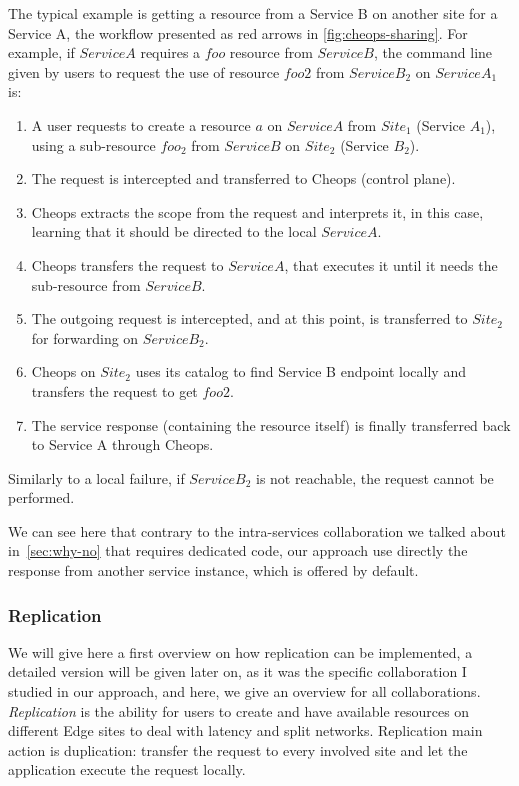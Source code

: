 The typical example is getting a resource from a Service B on another
site for a Service A, the workflow presented as red arrows in
\autoref{fig:cheops-sharing}.
%
For example, if $Service A$ requires a $foo$ resource from
$Service B$, the command line given by users to request the use of
resource $foo2$ from $Service B_2$ on $Service A_1$ is:

%

\begin{enumerate}
\item A user requests to create a resource $a$ on $Service A$ from $Site_1$
  (Service $A_1$), using a sub-resource $foo_2$ from $Service B$ on
  $Site_2$ (Service $B_2$).
\item The request is intercepted and transferred to Cheops (control
  plane).
\item Cheops extracts the scope from the request and interprets it, in
  this case, learning that it should be directed to the local
  $Service A$.
\item Cheops transfers the request to $Service A$, that executes it
  until it needs the sub-resource from $Service B$.
\item The outgoing request is intercepted, and at this point, is
  transferred to $Site_2$ for forwarding on $Service B_2$.
\item Cheops on $Site_2$ uses its catalog to find Service B endpoint
  locally and transfers the request to get $foo2$.
\item The service response (containing the resource itself) is finally
  transferred back to Service A through Cheops.
\end{enumerate}

Similarly to a local failure, if $Service B_2$ is not reachable, the
request cannot be performed.

We can see here that contrary to the intra-services collaboration we
talked about in~\autoref{sec:why-no} that requires dedicated code, our
approach use directly the response from another service instance,
which is offered by default.


\subsubsection{Replication}
\label{sssec:cheops-rep}

We will give here a first overview on how replication can be
implemented, a detailed version will be given later on, as it was the
specific collaboration I studied in our approach, and here, we give an
overview for all collaborations.
%
\emph{Replication} is the ability for users to create
and have available resources on different Edge sites to deal with
latency and split networks.
%
Replication main action is duplication: transfer the
request to every involved site and let the application execute the
request locally.
%

